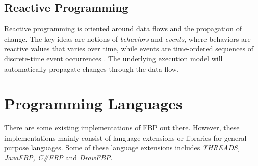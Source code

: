 \subsection{Reactive Programming}
Reactive programming is oriented around data flows and the propagation
of change. The key ideas are notions of \emph{behaviors} and
\emph{events}, where behaviors are reactive values that varies over
time, while events are time-ordered sequences of discrete-time event
occurrences \citep{wan:2000}. The underlying execution model will
automatically propagate changes through the data flow.


\section{Programming Languages}
There are some existing implementations of FBP out there. However,
these implementations mainly consist of language extensions or
libraries for general-purpose languages. Some of these language
extensions includes \emph{THREADS, JavaFBP, C\#FBP} and
\emph{DrawFBP}.\citep{morrison:2010}
